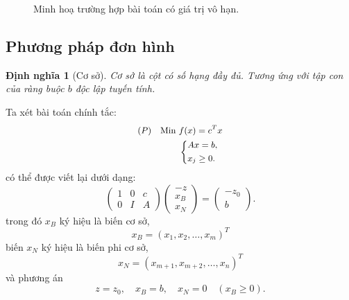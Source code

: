 \documentclass[12pt,a4paper]{report}
\newtheorem{dn}{Định nghĩa}
\begin{document}
\begin{itemize}
\begin{figure}
    \caption{Minh hoạ trường hợp bài toán có giá trị vô hạn.}
\end{figure}
\end{itemize}
\subsection{Phương pháp đơn hình}
\begin{dn}[Cơ sở]
Cơ sở là cột có số hạng đầy đủ. Tương ứng với tập con của ràng buộc $b$ độc lập tuyến tính.
\end{dn}

Ta xét bài toán chính tắc:
    \begin{equation} \small \label{chinhtac}
        \begin{split}
        (P) \quad \text{Min } & f(x) = c^Tx \\
            & \left\{
            \begin{split}
            & Ax=b, \\
            & x_j \geq 0.
            \end{split}
            \right.    
        \end{split}
    \end{equation}
có thể được viết lại dưới dạng:
\begin{equation}
\begin{pmatrix}
    1 & 0 & c \\
    0 & I & A
\end{pmatrix}
\begin{pmatrix}
    -z \\
    x_B \\
    x_N
\end{pmatrix}
=
\begin{pmatrix}
    -z_0 \\
    b
\end{pmatrix}.
\end{equation}
trong đó $x_B$ ký hiệu là biến cơ sở,
\begin{equation}
x_B=(x_1,x_2,\ldots,x_m)^T
\end{equation}
biến $x_N$ ký hiệu là biến phi cơ sở,
\begin{equation}
x_N=(x_{m+1},x_{m+2},\ldots,x_n)^T
\end{equation}
và phương án
\begin{equation}
z=z_0, \quad x_B=b, \quad x_N=0 \quad (x_B \geq 0).
\end{equation}
\end{document}
